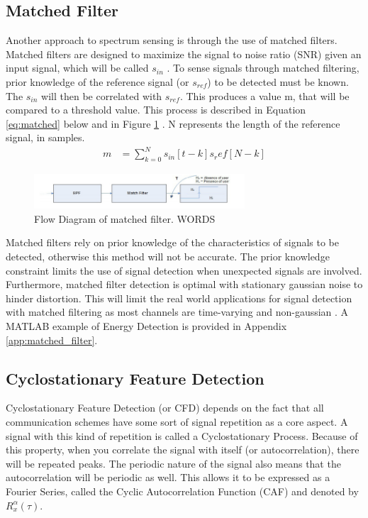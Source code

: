 \subsection{Matched Filter}
Another approach to spectrum sensing is through the use of matched filters. Matched filters are designed to maximize the signal to noise ratio (SNR) given an input signal, which will be called $s_{in}$ \cite{sensing_energy}. To sense signals through matched filtering, prior knowledge of the reference signal (or $s_{ref}$) to be detected must be known. The $s_{in}$ will then be correlated with $s_{ref}$. This produces a value m, that will be compared to a threshold value. This process is described in Equation \ref{eq:matched} below and in Figure \ref{figure:matched_filter}
. N represents the length of the reference signal, in samples. 
\begin{align} \label{eq:matched}
    m &= \sum_{k = 0}^{N}s_{in}[t-k]s_ref[N-k] 
\end{align}
\begin{figure}[ht]
\centering
\includegraphics[width=0.70\textwidth]{img/match_filter.png}
\caption{Flow Diagram of matched filter. WORDS}
\label{figure:matched_filter}
\end{figure}\par
Matched filters rely on prior knowledge of the characteristics of signals to be detected, otherwise this method will not be accurate. The prior knowledge constraint limits the use of signal detection when unexpected signals are involved. Furthermore, matched filter detection is optimal with stationary gaussian noise to hinder distortion. This will limit the real world applications for signal detection with matched filtering as most channels are time-varying and non-gaussian \cite{channel_fade}. A MATLAB example of Energy Detection is provided in Appendix \ref{app:matched_filter}.

\subsection{Cyclostationary Feature Detection} \label{Cyclostationary Feature Detection}
Cyclostationary Feature Detection (or CFD) depends on the fact that all communication schemes have some sort of signal repetition as a core aspect. A signal with this kind of repetition is called a Cyclostationary Process\cite{cyclostat_journal}. Because of this property, when you correlate the signal with itself (or autocorrelation), there will be repeated peaks. The periodic nature of the signal also means that the autocorrelation will be periodic as well. This allows it to be expressed as a Fourier Series, called the Cyclic Autocorrelation Function (CAF) and denoted by $R_x^\alpha(\tau)$\cite{cyclostat_text}.\par 

